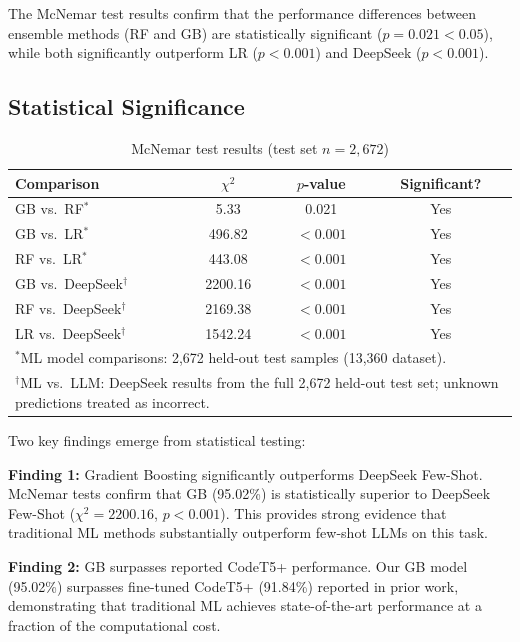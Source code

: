 \documentclass[10pt,a4paper]{article}
\begin{document}
The McNemar test results confirm that the performance differences between
ensemble methods (RF and GB) are statistically significant
($p = 0.021 < 0.05$), while both significantly outperform LR ($p < 0.001$)
and DeepSeek ($p < 0.001$).

\subsection{Statistical Significance}

\begin{table}[htbp]
\centering
\caption{McNemar test results (test set $n=2{,}672$)}
\label{tab:mcnemar}
\begin{tabular}{@{}lccc@{}}
\toprule
Comparison & $\chi^2$ & $p$-value & Significant? \\
\midrule
GB vs.\ RF$^{*}$    & 5.33  & 0.021 & Yes \\
GB vs.\ LR$^{*}$    & 496.82& $<0.001$ & Yes \\
RF vs.\ LR$^{*}$    & 443.08& $<0.001$ & Yes \\
GB vs.\ DeepSeek$^{\dagger}$ & 2200.16 & $<0.001$ & Yes \\
RF vs.\ DeepSeek$^{\dagger}$ & 2169.38 & $<0.001$ & Yes \\
LR vs.\ DeepSeek$^{\dagger}$ & 1542.24 & $<0.001$ & Yes \\
\multicolumn{4}{l}{\small $^{*}$ML model comparisons: 2,672 held-out test
       samples (13,360 dataset).} \\
\multicolumn{4}{l}{\small $^{\dagger}$ML vs.\ LLM: DeepSeek results from the
       full 2,672 held-out test set; unknown predictions treated as
       incorrect.} \\
\bottomrule
\end{tabular}
\end{table}

Two key findings emerge from statistical testing:

\textbf{Finding 1:} Gradient Boosting significantly outperforms DeepSeek
Few-Shot. McNemar tests confirm that GB (95.02\%) is statistically superior
to DeepSeek Few-Shot ($\chi^2 = 2200.16$, $p < 0.001$). This provides strong
evidence that traditional ML methods substantially outperform few-shot LLMs
on this task.

\textbf{Finding 2:} GB surpasses reported CodeT5+ performance. Our GB model
(95.02\%) surpasses fine-tuned CodeT5+ (91.84\%) reported in prior work,
demonstrating that traditional ML achieves state-of-the-art performance at a
fraction of the computational cost.
\end{document}
